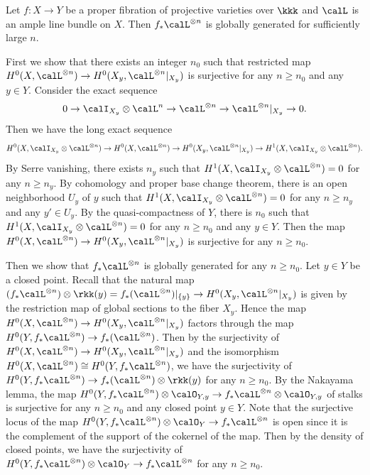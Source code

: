 \begin{remark}\label{rmk:pushforward-of-ample-is-globally-generated}
	Let $f: X \to Y$ be a proper fibration of projective varieties over $\kkk$ and $\calL$ is an ample line bundle on $X$.
	Then $f_*\calL^{\otimes n}$ is globally generated for sufficiently large $n$.

	First we show that there exists an integer $n_0$ such that restricted map $H^0(X, \calL^{\otimes n}) \to H^0(X_y, \calL^{\otimes n}|_{X_y})$ is surjective for any $n\ge n_0$ and any $y\in Y$.
	Consider the exact sequence
	\[ 0 \to \calI_{X_y}\otimes \calL^{n} \to \calL^{\otimes n} \to \calL^{\otimes n}|_{X_y} \to 0. \]
	Then we have the long exact sequence
	\[ H^0(X, \calI_{X_y}\otimes \calL^{\otimes n}) \to H^0(X, \calL^{\otimes n}) \to H^0(X_y, \calL^{\otimes n}|_{X_y}) \to H^1(X, \calI_{X_y}\otimes \calL^{\otimes n}). \]
	By Serre vanishing, there exists $n_y$ such that $H^1(X, \calI_{X_y}\otimes \calL^{\otimes n})=0$ for any $n\ge n_y$.
	By cohomology and proper base change theorem, there is an open neighborhood $U_y$ of $y$ such that $H^1(X, \calI_{X_y}\otimes \calL^{\otimes n})=0$ for any $n\ge n_y$ and any $y'\in U_y$.
	By the quasi-compactness of $Y$, there is $n_0$ such that $H^1(X, \calI_{X_y}\otimes \calL^{\otimes n})=0$ for any $n\ge n_0$ and any $y\in Y$.
	Then the map $H^0(X, \calL^{\otimes n}) \to H^0(X_y, \calL^{\otimes n}|_{X_y})$ is surjective for any $n\ge n_0$.

	Then we show that $f_*\calL^{\otimes n}$ is globally generated for any $n\ge n_0$.
	Let $y \in Y$ be a closed point.
	Recall that the natural map $(f_*\calL^{\otimes n})\otimes \rkk(y) = f_*(\calL^{\otimes n})|_{\{y\}} \to H^0(X_y, \calL^{\otimes n}|_{X_y})$ is given by the restriction map of global sections to the fiber $X_y$.
	Hence the map $H^0(X, \calL^{\otimes n}) \to H^0(X_y, \calL^{\otimes n}|_{X_y})$ factors through the map $H^0(Y, f_*\calL^{\otimes n}) \to f_*(\calL^{\otimes n})$.
	Then by the surjectivity of $H^0(X, \calL^{\otimes n}) \to H^0(X_y, \calL^{\otimes n}|_{X_y})$ and the isomorphism $H^0(X, \calL^{\otimes n}) \cong H^0(Y, f_*\calL^{\otimes n})$, we have the surjectivity of $H^0(Y, f_*\calL^{\otimes n}) \to f_*(\calL^{\otimes n})\otimes \rkk(y)$ for any $n\ge n_0$.
	By the Nakayama lemma, the map $H^0(Y, f_*\calL^{\otimes n})\otimes \calO_{Y,y} \to f_*\calL^{\otimes n}\otimes \calO_{Y,y}$ of stalks is surjective for any $n\ge n_0$ and any closed point $y\in Y$.
	Note that the surjective locus of the map $H^0(Y, f_*\calL^{\otimes n})\otimes \calO_{Y} \to f_*\calL^{\otimes n}$ is open since it is the complement of the support of the cokernel of the map.
	Then by the density of closed points, we have the surjectivity of $H^0(Y, f_*\calL^{\otimes n})\otimes \calO_{Y} \to f_*\calL^{\otimes n}$ for any $n\ge n_0$.
\end{remark}
